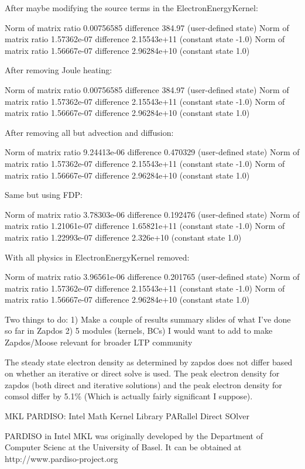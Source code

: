 After maybe modifying the source terms in the ElectronEnergyKernel:

Norm of matrix ratio 0.00756585 difference 384.97 (user-defined state)
Norm of matrix ratio 1.57362e-07 difference 2.15543e+11 (constant state -1.0)
Norm of matrix ratio 1.56667e-07 difference 2.96284e+10 (constant state 1.0)

After removing Joule heating:

Norm of matrix ratio 0.00756585 difference 384.97 (user-defined state)
Norm of matrix ratio 1.57362e-07 difference 2.15543e+11 (constant state -1.0)
Norm of matrix ratio 1.56667e-07 difference 2.96284e+10 (constant state 1.0)

After removing all but advection and diffusion:

Norm of matrix ratio 9.24413e-06 difference 0.470329 (user-defined state)
Norm of matrix ratio 1.57362e-07 difference 2.15543e+11 (constant state -1.0)
Norm of matrix ratio 1.56667e-07 difference 2.96284e+10 (constant state 1.0)

Same but using FDP:

Norm of matrix ratio 3.78303e-06 difference 0.192476 (user-defined state)
Norm of matrix ratio 1.21061e-07 difference 1.65821e+11 (constant state -1.0)
Norm of matrix ratio 1.22993e-07 difference 2.326e+10 (constant state 1.0)

With all physics in ElectronEnergyKernel removed:

Norm of matrix ratio 3.96561e-06 difference 0.201765 (user-defined state)
Norm of matrix ratio 1.57362e-07 difference 2.15543e+11 (constant state -1.0)
Norm of matrix ratio 1.56667e-07 difference 2.96284e+10 (constant state 1.0)

Two things to do:
1) Make a couple of results summary slides of what I've done so far in Zapdos
2) 5 modules (kernels, BCs) I would want to add to make Zapdos/Moose relevant for broader LTP community

The steady state electron density as determined by zapdos does not differ based on whether an iterative or direct solve is used. The peak electron density for zapdos (both direct and iterative solutions) and the peak electron density for comsol differ by 5.1\% (Which is actually fairly significant I suppose).

MKL PARDISO: Intel Math Kernel Library PARallel Direct SOlver

PARDISO in Intel MKL was originally developed by the Department of Computer Scienc at the University of Basel. It can be obtained at http://www.pardiso-project.org

